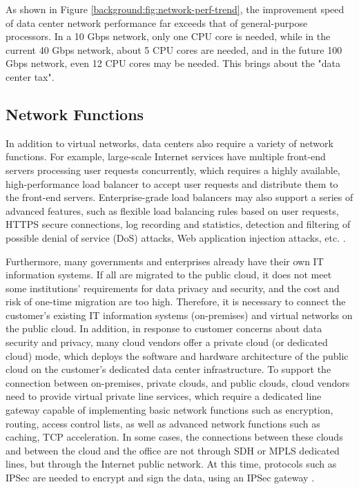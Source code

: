 As shown in Figure \ref{background:fig:network-perf-trend}, the improvement speed of data center network performance far exceeds that of general-purpose processors. In a 10 Gbps network, only one CPU core is needed, while in the current 40 Gbps network, about 5 CPU cores are needed, and in the future 100 Gbps network, even 12 CPU cores may be needed. This brings about the "data center tax".

\subsection{Network Functions}
\label{background:sec:network-function}

In addition to virtual networks, data centers also require a variety of network functions. For example, large-scale Internet services have multiple front-end servers processing user requests concurrently, which requires a highly available, high-performance load balancer to accept user requests and distribute them to the front-end servers. Enterprise-grade load balancers may also support a series of advanced features, such as flexible load balancing rules based on user requests, HTTPS secure connections, log recording and statistics, detection and filtering of possible denial of service (DoS) attacks, Web application injection attacks, etc. \cite{ananta}.

Furthermore, many governments and enterprises already have their own IT information systems. If all are migrated to the public cloud, it does not meet some institutions' requirements for data privacy and security, and the cost and risk of one-time migration are too high. Therefore, it is necessary to connect the customer's existing IT information systems (on-premises) and virtual networks on the public cloud. In addition, in response to customer concerns about data security and privacy, many cloud vendors offer a private cloud (or dedicated cloud) mode, which deploys the software and hardware architecture of the public cloud on the customer's dedicated data center infrastructure. To support the connection between on-premises, private clouds, and public clouds, cloud vendors need to provide virtual private line services, which require a dedicated line gateway capable of implementing basic network functions such as encryption, routing, access control lists, as well as advanced network functions such as caching, TCP acceleration. In some cases, the connections between these clouds and between the cloud and the office are not through SDH or MPLS dedicated lines, but through the Internet public network. At this time, protocols such as IPSec are needed to encrypt and sign the data, using an IPSec gateway \cite{son2017protego}.

